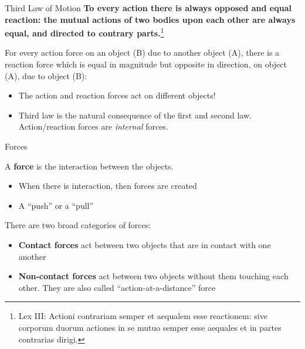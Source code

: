 \documentclass[12pt,compress,aspectratio=169]{beamer}
\newcommand{\mb}[1]{\ensuremath\mathbf{#1}}
\newcommand{\eq}[2]{\vspace{#1}{\Large\begin{displaymath}#2\end{displaymath}}}
\begin{document}
\begin{frame}{Third Law of Motion}
  \textbf{To every action there is always opposed and equal reaction: the
    mutual actions of two bodies upon each other are always equal, and directed
    to contrary parts.}\footnote{Lex III: Actioni contrariam semper et aequalem
    esse reactionem: sive corporum duorum actiones in se mutuo semper esse
    aequales et in partes contrarias dirigi.}
 
  \vspace{.1in}For every action force on an object (B) due to another object
  (A), there is a reaction force which is equal in magnitude but opposite in
  direction, on object (A), due to object (B):

  \eq{-.3in}{
    \boxed{\mb{F}_\text{AB} = -\mb{F}_\text{BA}}
  }
  \begin{itemize}
  \item The action and reaction forces act on different objects!
  \item Third law is the natural consequence of the first and second law.
    Action/reaction forces are \emph{internal} forces.
  \end{itemize}
  \vspace{.2in}
\end{frame}



\begin{frame}{Forces}

  A \textbf{force} is the interaction between the objects.
  \begin{itemize}
  \item When there is interaction, then forces are created
  \item A ``push'' or a ``pull''
  \end{itemize}

  There are two broad categories of forces:
  \begin{itemize}
  \item\textbf{Contact forces} act between two objects that are in contact
    with one another
  \item\textbf{Non-contact forces} act between two objects without them
    touching each other. They are also called ``action-at-a-distance'' force
  \end{itemize}
\end{frame}
\end{document}
